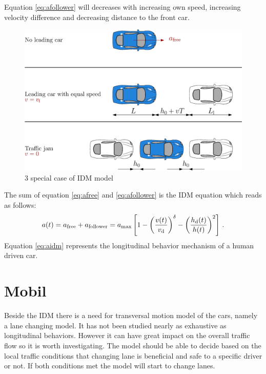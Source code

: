 \documentclass[a4paper,12pt,twoside]{report} %
\begin{document}
			Equation \ref{eq:afollower} will decreases with increasing own speed, increasing velocity difference and decreasing distance to the front car.
			\begin{figure}[ht]
				\centering
				\includegraphics[width=.95\textwidth]{idm.eps}
				\caption{3 special case of IDM model}
				\label{fig:idm}
			\end{figure}
			The sum of equation \ref{eq:afree} and \ref{eq:afollower} is the IDM equation which reads as follows:
			\begin{equation}
				a(t)=a_{\rm free}+a_{\rm follower}=a_{\rm max}\left [ 1 - \left ( \frac{v(t)}{v_{\rm d}} \right )^{\rm \delta} - \left ( \frac{h_{\rm d}(t)}{h(t)} \right )^2 \right ]\,.
				\label{eq:aidm}
			\end{equation}
			Equation \ref{eq:aidm} represents the longitudinal behavior mechanism of a human driven car.
		\section{Mobil} \label{sec:MOBIL}
			Beside the IDM there is a need for transversal motion model of the cars, namely a lane changing model. It has not been studied nearly as exhaustive as longitudinal behaviors. However it can have great impact on the overall traffic flow so it is worth investigating. The model should be able to decide based on the local traffic conditions that changing lane is beneficial and safe to a specific driver or not. If both conditions met the model will start to change lanes.
\end{document}
